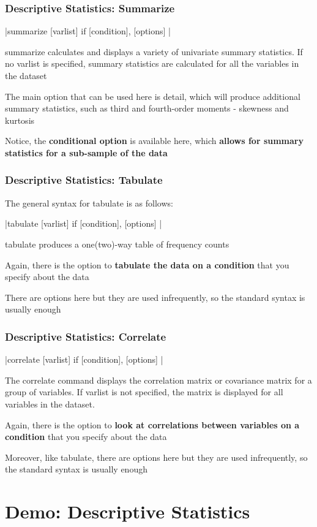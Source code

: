 \documentclass[10pt, compress]{beamer}
\begin{document}
\begin{frame}[fragile]
\frametitle{Descriptive Statistics: Summarize}

\begin{center}
|summarize [varlist] if [condition], [options] |
\end{center}

\alert{summarize} calculates and displays a variety of univariate summary statistics. If no \alert{varlist} is specified, summary statistics are calculated for all the variables in the dataset

The main option that can be used here is \alert{detail}, which will produce additional summary statistics, such as \alert{third and fourth-order moments - skewness and kurtosis} 

Notice, the \textbf{conditional option} is available here, which \textbf{allows for summary statistics for a sub-sample of the data}

\end{frame}

\begin{frame}[fragile]
\frametitle{Descriptive Statistics: Tabulate}

The \alert{general syntax} for \alert{tabulate} is as follows:

\begin{center}
|tabulate [varlist] if [condition], [options] |
\end{center}

\alert{tabulate} produces a one(two)-way table of frequency counts

Again, there is the option to \textbf{tabulate the data on a condition} that you specify about the data

There are options here but they are \alert{used infrequently}, so the standard syntax is \alert{usually} enough
\end{frame}

\begin{frame}[fragile]
\frametitle{Descriptive Statistics: Correlate}

\begin{center}
|correlate [varlist] if [condition], [options] |
\end{center}

The \alert{correlate} command displays the correlation matrix or covariance matrix for a group of
variables. If \alert{varlist is not specified}, the matrix is displayed for \alert{all variables} in the dataset.

Again, there is the option to \textbf{look at correlations between variables on a condition} that you specify about the data

Moreover, like tabulate, there are options here but they are \alert{used infrequently}, so the standard syntax is \alert{usually} enough

\end{frame}

\section{Demo: Descriptive Statistics}

\end{document}
